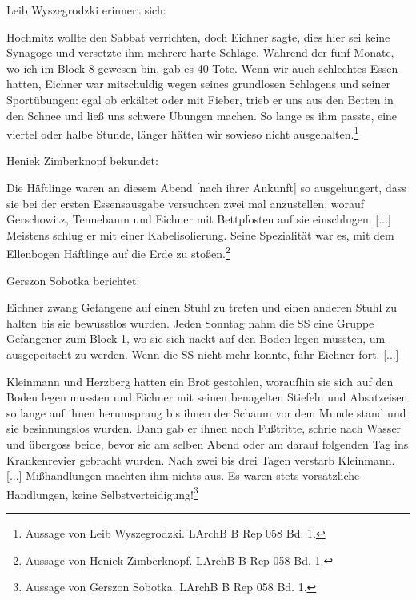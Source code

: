 Leib Wyszegrodzki erinnert sich:
\begin{leftbar}
 Hochmitz wollte den Sabbat verrichten, doch Eichner sagte, dies hier sei keine Synagoge und versetzte ihm mehrere harte Schläge. Während der fünf Monate, wo ich im Block 8 gewesen bin, gab es 40 Tote. Wenn wir auch schlechtes Essen hatten, Eichner war mitschuldig wegen seines grundlosen Schlagens und seiner Sportübungen: egal ob erkältet oder mit Fieber, trieb er uns aus den Betten in den Schnee und ließ uns schwere Übungen machen. So lange es ihm passte, eine viertel oder halbe Stunde, länger hätten wir sowieso nicht ausgehalten.\footnote{Aussage von Leib Wyszegrodzki. LArchB B Rep 058 Bd. 1.}
\end{leftbar}


Heniek Zimberknopf bekundet:
\begin{leftbar}
Die Häftlinge waren an diesem Abend [nach ihrer Ankunft] so ausgehungert, dass sie bei der ersten Essensausgabe versuchten zwei mal anzustellen, worauf Gerschowitz, Tennebaum und Eichner mit Bettpfosten auf sie einschlugen. [...] Meistens schlug er mit einer Kabelisolierung. Seine Spezialität war es, mit dem Ellenbogen Häftlinge auf die Erde zu stoßen.\footnote{Aussage von Heniek Zimberknopf. LArchB B Rep 058 Bd. 1.}
\end{leftbar}

Gerszon Sobotka berichtet:
\begin{leftbar}
Eichner zwang Gefangene auf einen Stuhl zu treten und einen anderen Stuhl zu halten bis sie bewusstlos wurden. Jeden Sonntag nahm die SS eine Gruppe Gefangener zum Block 1, wo sie sich nackt auf den Boden legen mussten, um ausgepeitscht zu werden. Wenn die SS nicht mehr konnte, fuhr Eichner fort. [...]

Kleinmann und Herzberg hatten ein Brot gestohlen, woraufhin sie sich auf den Boden legen mussten und Eichner mit seinen benagelten Stiefeln und Absatzeisen so lange auf ihnen herumsprang bis ihnen der Schaum vor dem Munde stand und sie besinnungslos wurden. Dann gab er ihnen noch Fußtritte, schrie nach Wasser und übergoss beide, bevor sie am selben Abend oder am darauf folgenden Tag ins Krankenrevier gebracht wurden. Nach zwei bis drei Tagen verstarb Kleinmann. [...] \newline
Mißhandlungen machten ihm nichts aus. Es waren stets vorsätzliche Handlungen, keine Selbstverteidigung!\footnote{Aussage von Gerszon Sobotka. LArchB B Rep 058 Bd. 1.}
\end{leftbar}

